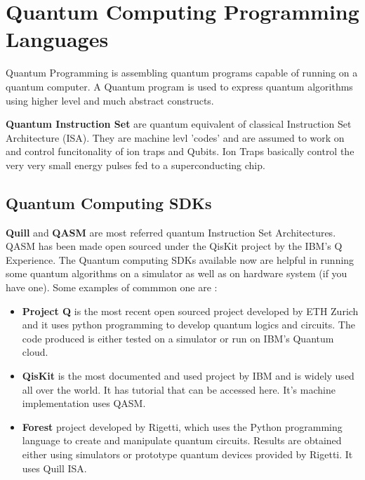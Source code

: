 \chapter{Quantum Computing Programming Languages}
Quantum Programming is assembling quantum programs capable of running on a quantum computer. A Quantum program is used to express quantum algorithms using higher level and much abstract constructs.

\textbf{Quantum Instruction Set} are quantum equivalent of classical Instruction Set Architecture (ISA). They are machine levl 'codes' and are assumed to work on and control funcitonality of ion traps and Qubits. Ion Traps basically control the very very small energy pulses fed to a superconducting chip.\\ 

\section{Quantum Computing SDKs}
\textbf{Quill}\cite{quill} and \textbf{QASM}\cite{qasm} are most referred quantum Instruction Set Architectures. QASM has been made open sourced under the QisKit project by the IBM's Q Experience. The Quantum computing SDKs available now are helpful in running some quantum algorithms on a simulator as well as on hardware system (if you have one). Some examples of commmon one are :

\begin{itemize}
\item{
	\textbf{Project Q}\cite{project_q} is the most recent open sourced project developed by ETH Zurich and it uses python programming to develop quantum logics and circuits. The code produced is either tested on a simulator or run on IBM's Quantum cloud.
}
\item{
	\textbf{QisKit}\cite{qiskit} is the most documented and used project by IBM and is widely used all over the world. It has tutorial that can be accessed here. It's machine implementation uses QASM.
}
\item{
	\textbf{Forest}\cite{forest} project developed by Rigetti, which uses the Python programming language to create and manipulate quantum circuits. Results are obtained either using simulators or prototype quantum devices provided by Rigetti. It uses Quill ISA.
}
\end{itemize}

